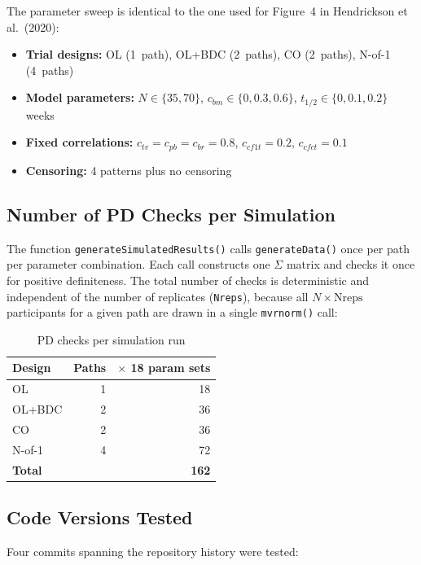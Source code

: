 \documentclass[11pt]{article}
\begin{document}
The parameter sweep is identical to the one used for Figure~4 in
Hendrickson et al.\ (2020):

\begin{itemize}[nosep]
\item \textbf{Trial designs:} OL (1~path), OL+BDC (2~paths),
  CO (2~paths), N-of-1 (4~paths)
\item \textbf{Model parameters:}
  $N \in \{35, 70\}$,
  $c_{bm} \in \{0, 0.3, 0.6\}$,
  $t_{1/2} \in \{0, 0.1, 0.2\}$ weeks
\item \textbf{Fixed correlations:}
  $c_{tv} = c_{pb} = c_{br} = 0.8$,
  $c_{cf1t} = 0.2$,
  $c_{cfct} = 0.1$
\item \textbf{Censoring:} 4 patterns plus no censoring
\end{itemize}

\subsection{Number of PD Checks per Simulation}

The function \texttt{generateSimulatedResults()} calls
\texttt{generateData()} once per path per parameter combination.
Each call constructs one $\Sigma$ matrix and checks it once for
positive definiteness. The total number of checks is
deterministic and independent of the number of replicates
(\texttt{Nreps}), because all $N \times \text{Nreps}$
participants for a given path are drawn in a single
\texttt{mvrnorm()} call:

\begin{table}[h]
\centering
\caption{PD checks per simulation run}
\begin{tabular}{lrr}
\toprule
Design & Paths & $\times$ 18 param sets \\
\midrule
OL & 1 & 18 \\
OL+BDC & 2 & 36 \\
CO & 2 & 36 \\
N-of-1 & 4 & 72 \\
\midrule
\textbf{Total} & & \textbf{162} \\
\bottomrule
\end{tabular}
\end{table}

\subsection{Code Versions Tested}

Four commits spanning the repository history were tested:
\end{document}
